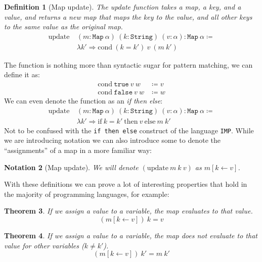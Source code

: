 \documentclass[
  a4paper, 
  10pt, 
  parskip=half, 
  DIV=20,
  toc=bibliography,
  usegeometry,
]{scrartcl}
\newtheorem{theorem}{Theorem}[section]
\newtheorem{definition}[theorem]{Definition}
\newtheorem{notation}[theorem]{Notation}
\newcommand{\funfont}[1]{\text{#1}}
\newcommand{\tyfont}[1]{\texttt{#1}}
\renewcommand{\mapsto}{\Rightarrow}
\begin{document}
\begin{definition}[Map update]
  The update function takes a map, a key, and a value, and returns a new map
  that maps the key to the value, and all other keys to the same value as the
  original map.
  \begin{align*}
  \funfont{update} \ & (m: \tyfont{Map} \ \alpha) \ (k: \tyfont{String}) \ (v: \alpha): \tyfont{Map} \ \alpha \coloneqq \\
                      &\lambda k' \mapsto \funfont{cond} \ (k = k') \ v \ (m \ k')
  \end{align*}
\end{definition}

The \funfont{cond} function is nothing more than syntactic sugar for 
pattern matching, we can define it as:
\begin{align*}
  \funfont{cond} \ \texttt{true} \ v \ w &\coloneqq v \\
  \funfont{cond} \ \texttt{false} \ v \ w &\coloneqq w
\end{align*}
We can even denote the \funfont{cond} function as an \emph{if then else}:
\begin{align*}
  \funfont{update} \ & (m: \tyfont{Map} \ \alpha) \ (k: \tyfont{String}) \ (v: \alpha): \tyfont{Map} \ \alpha \coloneqq \\
                      &\lambda k' \mapsto \text{if} \ k = k' \ \text{then} \ v \ \text{else} \ m \ k'
\end{align*}
Not to be confused with the \texttt{if then else} construct of the language 
\texttt{IMP}. While we are introducing notation we can also introduce some to 
denote the \enquote{assignments} of a map in a more familiar way:
\begin{notation}[Map update]
  We will denote \((\funfont{update} \ m \ k \ v)\) as \(m[k \leftarrow v]\).
\end{notation}

With these definitions we can prove a lot of interesting properties that hold
in the majority of programming languages, for example:

\begin{theorem}
  If we assign a value to a variable, the map evaluates to that value.
  \[
  (m[k \leftarrow v]) \ k = v
  \]
\end{theorem}

\begin{theorem}
  If we assign a value to a variable, the map does not evaluate to that value
  for other variables (\(k \neq k'\)).
  \[
  (m[k \leftarrow v]) \ k' = m \ k'
  \]
\end{theorem}
\end{document}

